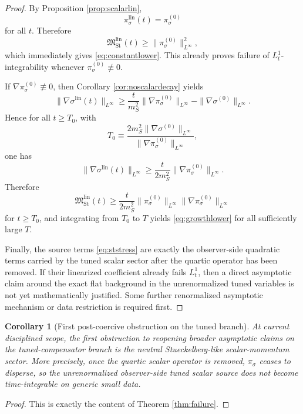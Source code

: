 \documentclass[11pt]{article}
\newtheorem{corollary}{Corollary}
\begin{document}
\begin{proof}
By Proposition \ref{prop:scalarlin},
\[
\pi_\sigma^{\mathrm{lin}}(t)=\pi_\sigma^{(0)}
\]
for all \(t\). Therefore
\[
\mathfrak M_{\mathrm{St}}^{\mathrm{lin}}(t)
\ge
\|\pi_\sigma^{(0)}\|_{L^\infty}^2,
\]
which immediately gives \eqref{eq:constantlower}. This already proves failure of \(L_t^1\)-integrability whenever \(\pi_\sigma^{(0)}\not\equiv 0\).

If \(\nabla\pi_\sigma^{(0)}\not\equiv 0\), then Corollary \ref{cor:noscalardecay} yields
\[
\|\nabla\sigma^{\mathrm{lin}}(t)\|_{L^\infty}
\ge
\frac{t}{m_S^2}\|\nabla\pi_\sigma^{(0)}\|_{L^\infty}
- \|\nabla\sigma^{(0)}\|_{L^\infty}.
\]
Hence for all \(t\ge T_0\), with
\[
T_0
\equiv
\frac{2m_S^2\|\nabla\sigma^{(0)}\|_{L^\infty}}
{\|\nabla\pi_\sigma^{(0)}\|_{L^\infty}},
\]
one has
\[
\|\nabla\sigma^{\mathrm{lin}}(t)\|_{L^\infty}
\ge
\frac{t}{2m_S^2}\|\nabla\pi_\sigma^{(0)}\|_{L^\infty}.
\]
Therefore
\[
\mathfrak M_{\mathrm{St}}^{\mathrm{lin}}(t)
\ge
\frac{t}{2m_S^2}
\|\pi_\sigma^{(0)}\|_{L^\infty}
\|\nabla\pi_\sigma^{(0)}\|_{L^\infty}
\]
for \(t\ge T_0\), and integrating from \(T_0\) to \(T\) yields \eqref{eq:growthlower} for all sufficiently large \(T\).

Finally, the source terms \eqref{eq:ststress} are exactly the observer-side quadratic terms carried by the tuned scalar sector after the quartic operator has been removed. If their linearized coefficient already fails \(L_t^1\), then a direct asymptotic claim around the exact flat background in the unrenormalized tuned variables is not yet mathematically justified. Some further renormalized asymptotic mechanism or data restriction is required first.
\end{proof}

\begin{corollary}[First post-coercive obstruction on the tuned branch]
\label{cor:obstruction}
At current disciplined scope, the first obstruction to reopening broader asymptotic claims on the tuned-compensator branch is the neutral Stueckelberg-like scalar-momentum sector. More precisely, once the quartic scalar operator is removed, \(\pi_\sigma\) ceases to disperse, so the unrenormalized observer-side tuned scalar source does not become time-integrable on generic small data.
\end{corollary}

\begin{proof}
This is exactly the content of Theorem \ref{thm:failure}.
\end{proof}
\end{document}
